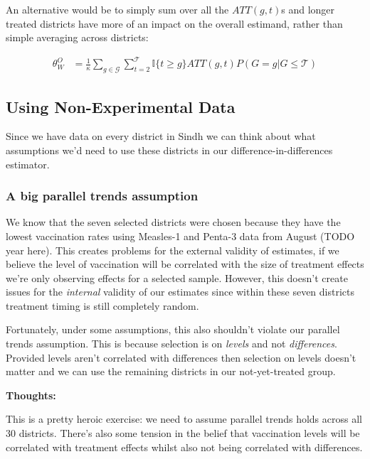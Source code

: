 \documentclass{article}
\begin{document}
   An alternative would be to simply sum over all the $ATT(g,t)$s and longer 
   treated districts have more of an impact on the overall estimand, rather than simple 
   averaging across districts:

   \begin{align*}
      \theta_W^O &= \frac{1}{\kappa} \sum_{g \in \mathcal{G}} \sum_{t=2}^\mathcal{T} 
      \mathbb{I}\{t \geq g\} ATT(g,t) P(G = g | G \leq \mathcal{T})
   \end{align*}



   \subsection*{Using Non-Experimental Data}

   Since we have data on every district in Sindh we can think about what assumptions 
   we'd need to use these districts in our difference-in-differences estimator.

   \subsubsection*{A big parallel trends assumption}
   We know that the seven selected districts were chosen because they have the 
   lowest vaccination rates using Measles-1 and Penta-3 data from August (TODO year here). This 
   creates problems for the external validity of estimates, if we believe 
   the level of vaccination will be correlated with the size of treatment effects 
   we're only observing effects for a selected sample. However, this doesn't create 
   issues for the \textit{internal} validity of our estimates since within these 
   seven districts treatment timing is still completely random.

   Fortunately, under some assumptions, this also shouldn't violate  our 
   parallel trends assumption. This 
   is because selection is on \textit{levels} and not \textit{differences}.  
   Provided levels aren't correlated with differences then selection on levels 
   doesn't matter and we can use the remaining districts in our not-yet-treated 
   group.

   \textbf{Thoughts:}

   This is a pretty heroic exercise: we need to assume parallel trends holds across 
   all 30 districts. There's also some tension in the belief that vaccination 
   levels will be correlated with treatment effects whilst also not being correlated 
   with differences.
\end{document}
